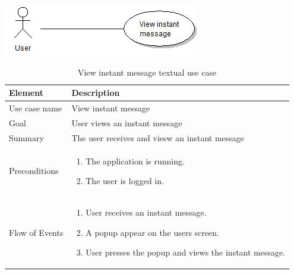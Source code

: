 \begin{table}
\begin{center}
\begin{center}
\includegraphics[width=\textwidth]{view_instant_message}
\end{center}
\begin{tabular}{p{3cm}|p{12cm}} \hline
Element & Description \\ \hline \hline
Use case name & View instant message \\
Goal & User views an instant message \\
Summary & The user receives and viesw an instant message \\
Preconditions &
\begin{enumerate}
\item{}The application is running.
\item{}The user is logged in.
\end{enumerate} \\ \hline
Flow of Events &
\begin{enumerate}
\item{}User receives an instant message.
\item{}A popup appear on the users screen.
\item{}User presses the popup and views the instant message.
\end{enumerate} \\ \hline
\end{tabular}
\end{center}
\caption{View instant message textual use case} \label{tab:createmessage}
\end{table}

